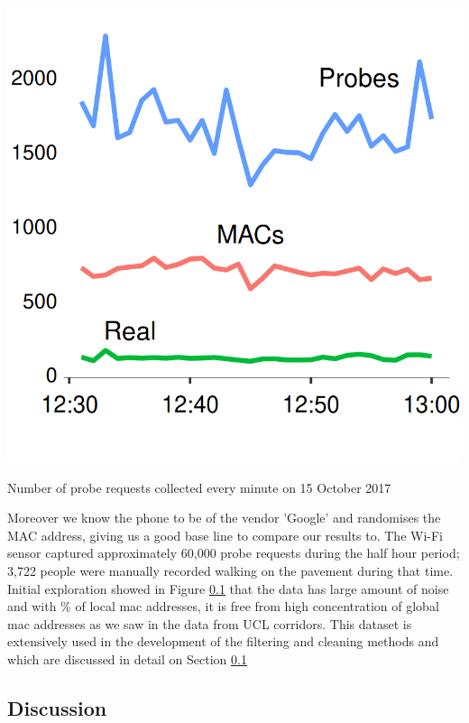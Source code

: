\begin{marginfigure}
  \forceversofloat
  \includegraphics[trim={0 0 0 0},clip]{images/oxst-counts.png}
  \caption{Number of probe requests collected every minute on 15 October 2017}
  \label{figure:collection:ucl:config}
\end{marginfigure}

Moreover we know the phone to be of the vendor 'Google' and randomises the MAC address, giving us a good base line to compare our results to.
The Wi-Fi sensor captured approximately 60,000 probe requests during the half hour period; 3,722 people were manually recorded walking on the pavement during that time.
Initial exploration showed in Figure \ref{} that the data has large amount of noise and with \% of local mac addresses, it is free from high concentration of global mac addresses as we saw in the data from UCL corridors.
This dataset is extensively used in the development of the filtering and cleaning methods and which are discussed in detail on Section \ref{}

\subsection{Discussion}

